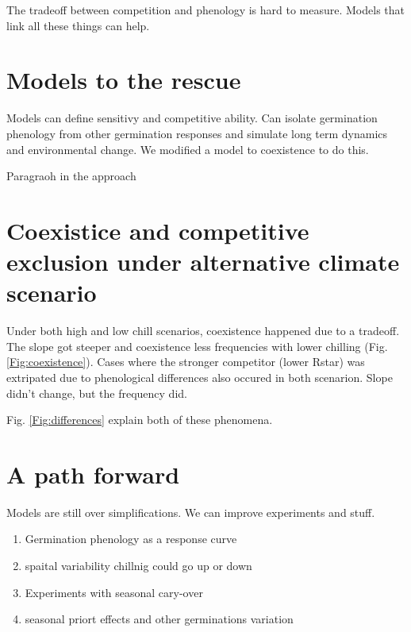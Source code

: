 \documentclass{article}[12pt]
\begin{document}
The tradeoff between competition and phenology is hard to measure. Models that link all these things can help.









\section{Models to the rescue}
Models can define sensitivy and competitive ability. Can isolate germination phenology from other germination responses and simulate long term dynamics and environmental change. We modified a model to coexistence to do this.

Paragraoh in the approach

\section{Coexistice and competitive exclusion under alternative climate scenario}
Under both high and low chill scenarios, coexistence happened due to a tradeoff. The slope got steeper and coexistence less frequencies with lower chilling (Fig. \ref{Fig:coexistence}). Cases where the stronger competitor (lower Rstar) was extripated due to phenological differences also occured in both scenarion. Slope didn't change, but the frequency did.

Fig. \ref{Fig:differences} explain both of these phenomena.


\section{A path forward}
Models are still over simplifications. We can improve experiments and stuff.
\begin{enumerate}
\item Germination phenology as a response curve
\item spaital variability chillnig could go up or down
\item Experiments with seasonal cary-over
\item seasonal priort effects and other germinations variation

\end{enumerate}
\pagebreak
\end{document}
